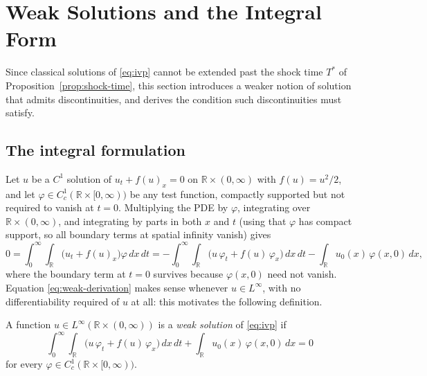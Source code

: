 \section{Weak Solutions and the Integral Form}
\label{sec:weak-solutions}

Since classical solutions of \eqref{eq:ivp} cannot be extended past the
shock time $T^*$ of Proposition~\ref{prop:shock-time}, this section
introduces a weaker notion of solution that admits discontinuities, and
derives the condition such discontinuities must satisfy.

\subsection{The integral formulation}
\label{subsec:integral-form}

Let $u$ be a $C^1$ solution of $u_t + f(u)_x = 0$ on $\mathbb{R} \times
(0,\infty)$ with $f(u)=u^2/2$, and let $\varphi \in C_c^1(\mathbb{R}
\times [0,\infty))$ be any test function, compactly supported but not
required to vanish at $t=0$. Multiplying the PDE by $\varphi$, integrating
over $\mathbb{R}\times(0,\infty)$, and integrating by parts in both $x$
and $t$ (using that $\varphi$ has compact support, so all boundary terms
at spatial infinity vanish) gives
\begin{equation}
  \label{eq:weak-derivation}
  0 = \int_0^\infty\!\!\int_{\mathbb{R}} \big(u_t + f(u)_x\big)\varphi\, dx\, dt
  = -\int_0^\infty\!\!\int_{\mathbb{R}} \big(u\,\varphi_t + f(u)\,\varphi_x\big)\, dx\, dt
  - \int_{\mathbb{R}} u_0(x)\, \varphi(x,0)\, dx,
\end{equation}
where the boundary term at $t=0$ survives because $\varphi(x,0)$ need not
vanish. Equation \eqref{eq:weak-derivation} makes sense whenever $u \in
L^\infty$, with no differentiability required of $u$ at all: this
motivates the following definition.

\begin{definition}
\label{def:weak-solution}
A function $u \in L^\infty(\mathbb{R}\times(0,\infty))$ is a \emph{weak
solution} of \eqref{eq:ivp} if
\begin{equation}
  \label{eq:weak-formulation}
  \int_0^\infty\!\!\int_{\mathbb{R}} \big(u\,\varphi_t + f(u)\,\varphi_x\big)\, dx\, dt
  + \int_{\mathbb{R}} u_0(x)\, \varphi(x,0)\, dx = 0
\end{equation}
for every $\varphi \in C_c^1(\mathbb{R}\times[0,\infty))$.
\end{definition}

